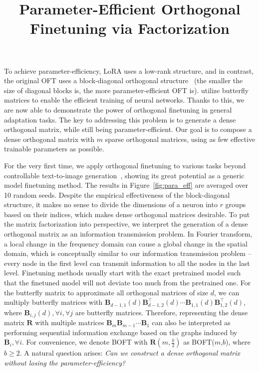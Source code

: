 \title{Parameter-Efficient Orthogonal Finetuning via Factorization}
To achieve parameter-efficiency, LoRA uses a low-rank structure, and in contrast, the original OFT uses a block-diagonal orthogonal structure~\cite{qiu2023controlling} (the smaller the size of diagonal blocks is, the more parameter-efficient OFT is). \cite{chen2022pixelated,dao2022monarch} utilize  butterfly matrices to enable the efficient training of neural networks. Thanks to this, we are now able to demonstrate the power of orthogonal finetuning in general adaptation tasks. The key to addressing this problem is to generate a dense orthogonal matrix, while still being parameter-efficient. Our goal is to compose a dense orthogonal matrix with $m$ sparse orthogonal matrices, using as few effective trainable parameters as possible. \item For the very first time, we apply orthogonal finetuning to various tasks beyond controllable text-to-image generation~\cite{qiu2023controlling}, showing its great potential as a generic model finetuning method. The results in Figure~\ref{fig:para_eff} are averaged over 10 random seeds. Despite the empirical effectiveness of the block-diagonal structure, it makes no sense to divide the dimensions of a neuron into $r$ groups based on their indices, which makes dense orthogonal matrices desirable. To put the matrix factorization into perspective, we interpret the generation of a dense orthogonal matrix as an information transmission problem. In Fourier transform, a local change in the frequency domain can cause a global change in the spatial domain, which is conceptually similar to our information transmission problem -- every node in the first level can transmit information to all the nodes in the last level. Finetuning methods usually start with the exact pretrained model such that the finetuned model will not deviate too much from the pretrained one. For the butterfly matrix to approximate all orthogonal matrices of size $d$, we can multiply butterfly matrices with  $\bm{B}_{d-1,1}(d)\bm{B}^\top_{d-1,2}(d)\cdots\bm{B}_{1,1}(d)\bm{B}^\top_{1,2}(d)$, where $\bm{B}_{i,j}(d),\forall i,\forall j$ are butterfly matrices. Therefore, representing the dense matrix $\bm{R}$ with multiple matrices $\bm{B}_m\bm{B}_{m-1}\cdots\bm{B}_1$ can also be interpreted as performing sequential information exchange based on the graphs induced by $\bm{B}_i, \forall i$. For convenience, we denote BOFT with $\bm{R}(m,\frac{b}{2})$ as BOFT($m$,$b$), where $b\geq 2$. A natural question arises: \emph{Can we construct a dense orthogonal matrix without losing the parameter-efficiency?}

